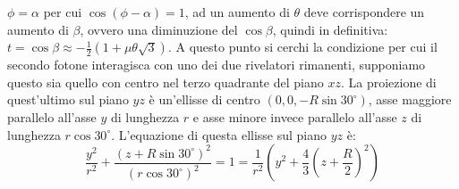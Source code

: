   \( \phi = \alpha \) per cui \(\cos \left( \phi - \alpha \right) = 1\), ad un aumento di \(\theta\) deve corrispondere un aumento di \(\beta\), ovvero una diminuzione del \(\cos \beta\),
  quindi in definitiva: \(t= \cos \beta \approx -\frac{1}{2} \left( 1 + \mu \theta \sqrt{3} \right) \).
  A questo punto si cerchi la condizione per cui il secondo fotone interagisca con uno dei due rivelatori rimanenti, supponiamo questo sia quello con centro nel terzo quadrante
  del piano \(xz\). La proiezione di quest'ultimo sul piano \(yz\) è un'ellisse di centro \(\left(0,0,-R \sin 30^\circ \right)\), asse maggiore parallelo all'asse \(y\) di lunghezza \(r\) e asse minore invece parallelo
  all'asse \(z\) di lunghezza \(r \cos 30^\circ\). L'equazione di questa ellisse sul piano \(yz\) è:
  $$ \frac{y^2}{r^2} + \frac{\left( z + R \sin 30^\circ \right)^2}{\left(r \cos 30^\circ\right)^2} = 1 = \frac{1}{r^2}\left(y^2 + \frac{4}{3} \left( z + \frac{R}{2} \right)^2 \right) $$
  
  
  
